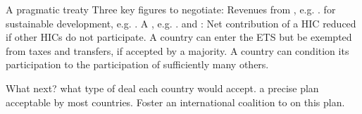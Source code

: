 \documentclass[aspectratio=169,xcolor=dvipsnames, 11pt,mathserif]{beamer}
\begin{document}
\begin{frame}{A pragmatic treaty}
    \bbsp
    \ip Three key figures to negotiate:
    \bbsp \ip Revenues from , e.g. .
    \ip {} for sustainable development, e.g. .
    \ip A , e.g. .
    \ee
    \ip {} and :
    \bbsp \ip Net contribution of a HIC reduced if other HICs do not participate.
    \ip A country can enter the ETS but be exempted from taxes and transfers, if accepted by a majority.
    \ip A country can condition its participation to the participation of sufficiently many others.
    \ee
    \ee
\end{frame}


\begin{frame}{What next?}
    \bbsp
    \ip {} what type of deal each country would accept.
    \ip {} a precise plan acceptable by most countries.
    \ip Foster an international coalition to  on this plan.
    \ee
\end{frame}






\end{document}
